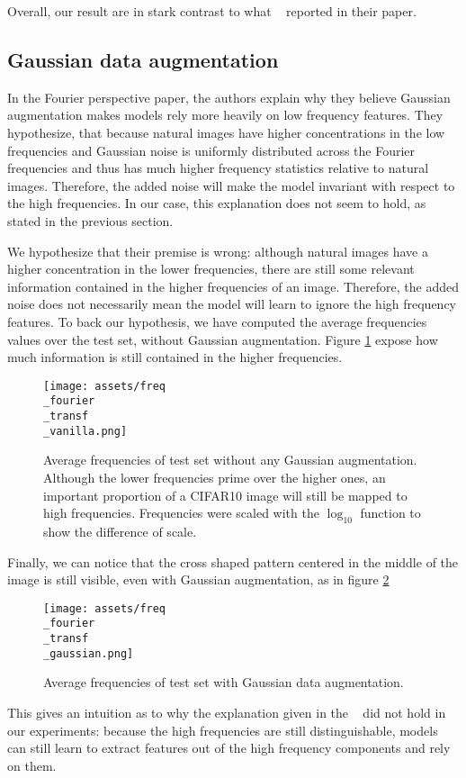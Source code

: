 \documentclass{article} \author{Simon Théorêt}
\begin{document}
Overall, our result are in stark contrast to what
~\citep{yin2020fourier} reported in their paper.

\subsection{Gaussian data augmentation}
In the Fourier perspective paper, the authors explain why they believe
Gaussian augmentation makes models rely more heavily on low frequency
features. They hypothesize, that because natural images have higher
concentrations in the low frequencies and Gaussian noise is uniformly
distributed across the Fourier frequencies and thus has much higher
frequency statistics relative to natural images. Therefore, the added
noise will make the model invariant with respect to the high
frequencies. In our case, this explanation does not seem to hold, as
stated in the previous section.

We hypothesize that their premise is wrong: although natural images
have a higher concentration in the lower frequencies, there are still
some relevant information contained in the higher frequencies of an
image. Therefore, the added noise does not necessarily mean the model
will learn to ignore the high frequency features. To back our
hypothesis, we have computed the average frequencies values over the
test set, without Gaussian augmentation. Figure
\ref{fig:fouriervanillafreq} expose how much information is still
contained in the higher frequencies.

\begin{figure}[h!]
  \centering
  \texttt{[image: assets/freq\\\_fourier\\\_transf\\\_vanilla.png]}
  \caption{Average frequencies of test set without any Gaussian
    augmentation. Although the lower frequencies prime over the higher
    ones, an important proportion of a CIFAR10 image will still be
    mapped to high frequencies. Frequencies were scaled with the
    $\log_{10}$ function to show the difference of scale. }
	\label{fig:fouriervanillafreq}
\end{figure}
Finally, we can notice that the cross shaped pattern centered in the
middle of the image is still visible, even with Gaussian augmentation,
as in figure \ref{fig:fouriergaussianfreq}
\begin{figure}[h!]
  \centering \texttt{[image: assets/freq\\\_fourier\\\_transf\\\_gaussian.png]}
  \caption{Average frequencies of test set with Gaussian data
    augmentation.}
	\label{fig:fouriergaussianfreq}
\end{figure}
This gives an intuition as to why the explanation given in the
~\citep{yin2020fourier} did not hold in our experiments: because the
high frequencies are still distinguishable, models can still learn to
extract features out of the high frequency components and rely on
them.
\end{document}
